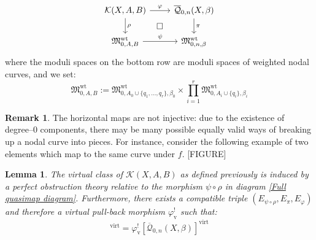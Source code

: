 \documentclass[11pt]{amsart}
\newcommand{\Q}[4]{\overline{\mathcal Q}_{#1,#2}(#3,#4)}
\newcommand{\MM}{\mathfrak M}
\newcommand{\virt}[1]{[#1]^{\operatorname{virt}}}
\theoremstyle{plain}
\newtheorem{lemma}[thm]{Lemma}
\theoremstyle{definition}
\newtheorem{remark}[thm]{Remark}
\begin{document}
\begin{equation} \label{Full quasimap diagram}
\begin{tikzcd}
\mathcal{K}(X,A,B) \ar[r,"\varphi"] \ar[d,"\rho"] \ar[rd,phantom,"\square"] & \Q{0}{n}{X}{\beta} \ar[d,"\pi"] \\
\MM_{0,A,B}^{\operatorname{wt}} \ar[r,"\psi"] & \MM_{0,n,\beta}^{\operatorname{wt}}
\end{tikzcd}
\end{equation}
where the moduli spaces on the bottom row are moduli spaces of weighted nodal curves, and we set:
\begin{equation*} \MM_{0,A,B}^{\operatorname{wt}} := \MM_{0,A_0\cup\{q_1,\ldots,q_r\},\beta_0}^{\operatorname{wt}} \times \prod_{i=1}^r \MM_{0,A_i\cup\{q_i\},\beta_i}^{\operatorname{wt}} \end{equation*}

\begin{remark} The horizontal maps are not injective: due to the existence of degree--$0$ components, there may be many possible equally valid ways of breaking up a nodal curve into pieces. For instance, consider the following example of two elements which map to the same curve under $f$.
[FIGURE]
\end{remark}

\begin{lemma} \label{Lemma product class equals pullback class} The virtual class of $\mathcal{K}(X,A,B)$ as defined previously is induced by a perfect obstruction theory relative to the morphism $\psi \circ \rho$ in diagram \eqref{Full quasimap diagram}. Furthermore, there exists a compatible triple $(E_{\psi \circ \rho}, E_{\pi}, E_{\varphi})$ and therefore a virtual pull-back morphism $\varphi_{\text{v}}^!$ such that:
\begin{equation*} \virt{\mathcal{K}(X,A,B)} = \varphi_{\text{v}}^! \virt{\Q{0}{n}{X}{\beta}} \end{equation*} \end{lemma}
\end{document}
